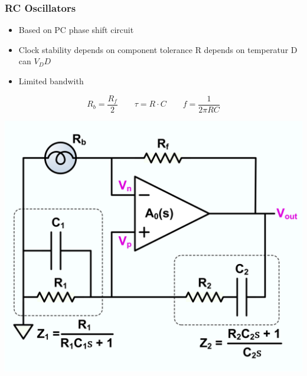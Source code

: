 \subsubsection{RC Oscillators}
\begin{minipage}{0.5\linewidth}
\begin{itemize}
    \item Based on PC phase shift circuit
    \item Clock stability depends on component tolerance
        \subitem R depends on temperatur
        \subitem D can $ V_DD $
    \item Limited bandwith   
\end{itemize}
\[ R_b = \dfrac{R_f}{2} \qquad \tau=R\cdot C \qquad f = \dfrac{1}{2 \pi RC}  \]
\end{minipage}
\begin{minipage}{0.5\linewidth}
    \hspace{1cm}\includegraphics[width=0.5\linewidth]{images/RCOscillator} 
\end{minipage}

